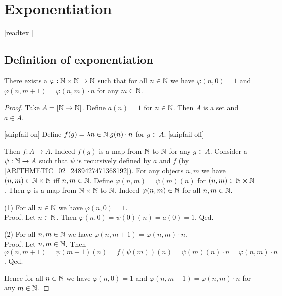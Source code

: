 \documentclass[../arithmetic.tex]{subfiles}
\begin{document}
  \chapter{Exponentiation}\label{chapter:exponentiation}


  \begin{forthel}

    [readtex ]

  \end{forthel}


  \section{Definition of exponentiation}

  \begin{forthel}
    \begin{lemma}
      There exists a $\varphi : \mathbb{N} \times \mathbb{N} \to \mathbb{N}$ such
      that for all $n \in \mathbb{N}$ we have $\varphi(n, 0) = 1$ and
      $\varphi(n, m + 1) = \varphi(n,m) \cdot n$ for any $m \in \mathbb{N}$.
    \end{lemma}
    \begin{proof}
      Take $A = [\mathbb{N} \to \mathbb{N}]$.
      Define $a(n) = 1$ for $n \in \mathbb{N}$.
      Then $A$ is a set and $a \in A$.

      [skipfail on] %
      Define $f(g) = \mathrm{\lambda} n \in \mathbb{N}. g(n) \cdot n$ for $g \in A$.
      [skipfail off]

      Then $f : A \to A$.
      Indeed $f(g)$ is a map from $\mathbb{N}$ to $\mathbb{N}$ for any $g \in A$.
      Consider a $\psi : \mathbb{N} \to A$ such that $\psi$ is recursively defined by
      $a$ and $f$ (by \cref{ARITHMETIC_02_2489427471368192}).
      For any objects $n, m$ we have $(n,m) \in \mathbb{N} \times \mathbb{N}$ iff
      $n, m \in \mathbb{N}$.
      Define $\varphi(n,m) = \psi(m)(n)$ for $(n,m) \in \mathbb{N} \times \mathbb{N}$.
      Then $\varphi$ is a map from $\mathbb{N} \times \mathbb{N}$ to $\mathbb{N}$.
      Indeed $\varphi(n,m) \in \mathbb{N}$ for all $n, m \in \mathbb{N}$.

      (1) For all $n \in \mathbb{N}$ we have $\varphi(n,0) = 1$. \\
      Proof.
        Let $n \in \mathbb{N}$.
        Then $\varphi(n,0)
          = \psi(0)(n)
          = a(0)
          = 1$.
      Qed.

      (2) For all $n, m \in \mathbb{N}$ we have $\varphi(n, m + 1) =
      \varphi(n,m) \cdot n$. \\
      Proof.
        Let $n, m \in \mathbb{N}$.
        Then $\varphi(n, m + 1)
          = \psi(m + 1)(n)
          = f(\psi(m))(n)
          = \psi(m)(n) \cdot n
          = \varphi(n,m) \cdot n$.
      Qed.

      Hence for all $n \in \mathbb{N}$ we have $\varphi(n, 0) = 1$ and
      $\varphi(n, m + 1) = \varphi(n,m) \cdot n$ for any $m \in \mathbb{N}$.
    \end{proof}
  \end{forthel}
\end{document}
